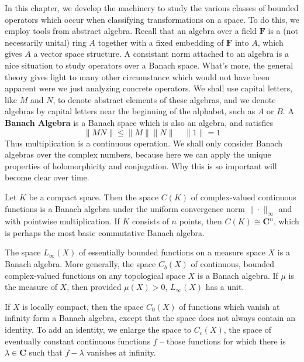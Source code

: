 In this chapter, we develop the machinery to study the various classes of bounded operators which occur when classifying transformations on a space. To do this, we employ tools from abstract algebra. Recall that an algebra over a field $\mathbf{F}$ is a (not necessarily unital) ring $A$ together with a fixed embedding of $\mathbf{F}$ into $A$, which gives $A$ a vector space structure. A consistant norm attached to an algebra is a nice situation to study operators over a Banach space. What's more, the general theory gives light to many other circumstance  which would not have been apparent were we just analyzing concrete operators. We shall use capital letters, like $M$ and $N$, to denote abstract elements of these algebras, and we denote algebras by capital letters near the beginning of the alphabet, such as $A$ or $B$. A {\bf Banach Algebra} is a Banach space which is also an algebra, and satisfies
%
\begin{equation} \label{algebranorm} \| MN \| \leq \| M \| \| N \|\ \ \ \ \ \| 1 \| = 1 \end{equation}
%
Thus multiplication is a continuous operation. We shall only consider Banach algebras over the complex numbers, because here we can apply the unique properties of holomorphicity and conjugation. Why this is so important will become clear over time.

\begin{example}
    Let $K$ be a compact space. Then the space $C(K)$ of complex-valued continuous functions is a Banach algebra under the uniform convergence norm $\| \cdot \|_\infty$ and with pointwise multiplication. If $K$ consists of $n$ points, then $C(K) \cong \mathbf{C}^n$, which is perhaps the most basic commutative Banach algebra.
\end{example}

\begin{example}
    The space $L_\infty(X)$ of essentially bounded functions on a measure space $X$ is a Banach algebra. More generally, the space $C_b(X)$ of continuous, bounded complex-valued functions on any topological space $X$ is a Banach algebra. If $\mu$ is the measure of $X$, then provided $\mu(X) > 0$, $L_\infty(X)$ has a unit.
\end{example}

\begin{example}
    If $X$ is locally compact, then the space $C_0(X)$ of functions which vanish at infinity form a Banach algebra, except that the space does not always contain an identity. To add an identity, we enlarge the space to $C_c(X)$, the space of eventually constant continuous functions $f$ -- those functions for which there is $\lambda \in \mathbf{C}$ such that $f - \lambda$ vanishes at infinity.
\end{example}

